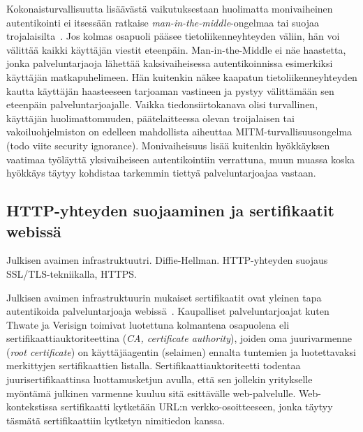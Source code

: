 \documentclass[finnish,gradu]{tktltiki}
\begin{document}
  Kokonaisturvallisuutta lisäävästä vaikutuksestaan huolimatta monivaiheinen autentikointi ei itsessään ratkaise \emph{man-in-the-middle}-ongelmaa tai suojaa trojalaisilta~\cite{schneier_2factor_2005}. Jos kolmas osapuoli pääsee tietoliikenneyhteyden väliin, hän voi välittää kaikki käyttäjän viestit eteenpäin. Man-in-the-Middle ei näe haastetta, jonka palveluntarjaoja lähettää kaksivaiheisessa autentikoinnissa esimerkiksi käyttäjän matkapuhelimeen. Hän kuitenkin näkee kaapatun tietoliikenneyhteyden kautta käyttäjän haasteeseen tarjoaman vastineen ja pystyy välittämään sen eteenpäin palveluntarjoajalle. Vaikka tiedonsiirtokanava olisi turvallinen, käyttäjän huolimattomuuden, päätelaitteessa olevan troijalaisen tai vakoiluohjelmiston on edelleen mahdollista aiheuttaa MITM-turvallisuusongelma~\cite{schneier_2factor_2012} (todo viite security ignorance). Monivaiheisuus lisää kuitenkin hyökkäyksen vaatimaa työläyttä yksivaiheiseen autentikointiin verrattuna, muun muassa koska hyökkäys täytyy kohdistaa tarkemmin tiettyä palveluntarjoajaa vastaan.






  \subsection{HTTP-yhteyden suojaaminen ja sertifikaatit webissä} %
  \label{sub:sertifikaatit_webissä}
  Julkisen avaimen infrastruktuutri.
  Diffie-Hellman.
  HTTP-yhteyden suojaus SSL/TLS-tekniikalla, HTTPS.

  Julkisen avaimen infrastruktuurin mukaiset sertifikaatit ovat yleinen tapa autentikoida palveluntarjoaja webissä~\cite{id_in_federation_systems_2005}. Kaupalliset palveluntarjoajat kuten Thwate ja Verisign toimivat luotettuna kolmantena osapuolena eli sertifikaattiauktoriteettina (\emph{CA, certificate authority}), joiden oma juurivarmenne (\emph{root certificate}) on käyttäjäagentin (selaimen) ennalta tuntemien ja luotettavaksi merkittyjen sertifikaattien listalla. Sertifikaattiauktoriteetti todentaa juurisertifikaattinsa luottamusketjun avulla, että sen jollekin yritykselle myöntämä julkinen varmenne kuuluu sitä esittävälle web-palvelulle. Web-kontekstissa sertifikaatti kytketään URL:n verkko-osoitteeseen, jonka täytyy täsmätä sertifikaattiin kytketyn nimitiedon kanssa.
\end{document}
